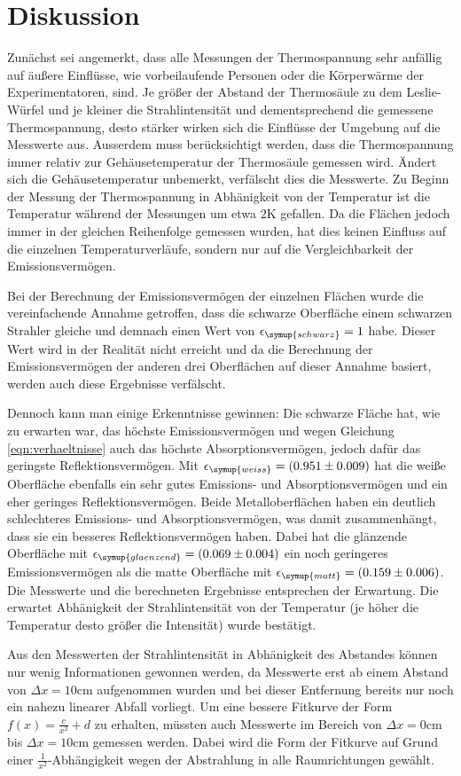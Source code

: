 \section{Diskussion}
\label{sec:Diskussion}
Zunächst sei angemerkt, dass alle Messungen der Thermospannung sehr anfällig auf
äußere Einflüsse, wie vorbeilaufende Personen oder die Körperwärme der Experimentatoren,
sind. Je größer der Abstand der Thermosäule zu dem Leslie-Würfel und je kleiner
die Strahlintensität und dementsprechend die gemessene Thermospannung, desto stärker
wirken sich die Einflüsse der Umgebung auf die Messwerte aus.
Ausserdem muss berücksichtigt werden, dass die Thermospannung immer relativ zur
Gehäusetemperatur der Thermosäule gemessen wird. Ändert sich die Gehäusetemperatur
unbemerkt, verfälscht dies die Messwerte.
Zu Beginn der Messung der Thermospannung in Abhänigkeit von der Temperatur ist
die Temperatur während der Messungen um etwa $2 \si{\kelvin}$ gefallen. Da die Flächen
jedoch immer in der gleichen Reihenfolge gemessen wurden, hat dies keinen Einfluss
auf die einzelnen Temperaturverläufe, sondern nur auf die Vergleichbarkeit der
Emissionsvermögen.

Bei der Berechnung der Emissionsvermögen der einzelnen Flächen wurde die vereinfachende
Annahme getroffen, dass die schwarze Oberfläche einem schwarzen Strahler gleiche
und demnach einen Wert von $\epsilon_\symup{schwarz} = 1$ habe. Dieser Wert wird
in der Realität nicht erreicht und da die Berechnung der Emissionsvermögen der
anderen drei Oberflächen auf dieser Annahme basiert, werden auch diese Ergebnisse
verfälscht.

Dennoch kann man einige Erkenntnisse gewinnen:\newline
Die schwarze Fläche hat, wie zu erwarten war, das höchste Emissionsvermögen und
wegen Gleichung \eqref{eqn:verhaeltnisse} auch das höchste Absorptionsvermögen, jedoch dafür das geringste
Reflektionsvermögen.
Mit $\epsilon_\symup{weiss} = (0.951\pm0.009)$ hat die weiße Oberfläche ebenfalls
ein sehr gutes Emissions- und Absorptionsvermögen und ein eher geringes Reflektionsvermögen.
Beide Metalloberflächen haben ein deutlich schlechteres Emissions- und Absorptionsvermögen,
was damit zusammenhängt, dass sie ein besseres Reflektionsvermögen haben.
Dabei hat die glänzende Oberfläche mit $\epsilon_\symup{glaenzend} = (0.069\pm0.004)$
ein noch geringeres Emissionsvermögen als die matte Oberfläche mit
$\epsilon_\symup{matt} = (0.159\pm0.006)$.
Die Messwerte und die berechneten Ergebnisse entsprechen der Erwartung. Die erwartet
Abhänigkeit der Strahlintensität von der Temperatur (je höher die Temperatur desto
größer die Intensität) wurde bestätigt.

Aus den Messwerten der Strahlintensität in Abhänigkeit des Abstandes können nur
wenig Informationen gewonnen werden, da Messwerte erst ab einem Abstand von
$\Delta x = 10 \si{\centi\meter}$ aufgenommen wurden und bei dieser Entfernung
bereits nur noch ein nahezu linearer Abfall vorliegt. Um eine bessere Fitkurve der
Form $f(x) = \frac{c}{x^2} + d $ zu erhalten, müssten auch Messwerte im Bereich
von $\Delta x = 0 \si{\centi\meter}$ bis $\Delta x = 10 \si{\centi\meter}$ gemessen
werden. Dabei wird die Form der Fitkurve auf Grund einer $\frac{1}{x^2}$-Abhängigkeit
wegen der Abstrahlung in alle Raumrichtungen gewählt.
